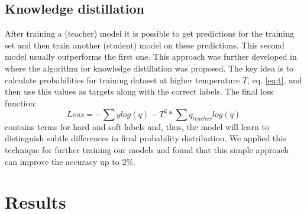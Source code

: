 \documentclass{article}
\begin{document}
\subsection{Knowledge distillation}
After training a (teacher) model it is possible to get predictions for the training set and then train another (student) model on these predictions. This second model usually outperforms the first one. This approach was further developed in\cite{Hinton} where the algorithm for knowledge distillation was proposed. The key idea is to calculate probabilities for training dataset at higher temperature $T$, eq. \ref{eq:t}, and then use this values as targets along with the correct labels. The final loss function:
\begin{equation}
\label{eq:hard}
Loss = -\sum y log(q) - T^2 * \sum q_{teacher} log(q)  
\end{equation}
contains terms for hard and soft labels and, thus, the model will learn to distinguish subtle differences in final probability distribution. We applied this technique for further training our models and found that this simple approach can improve the accuracy up to 2\%.

\section{Results}
\label{sec:results}
\end{document}
